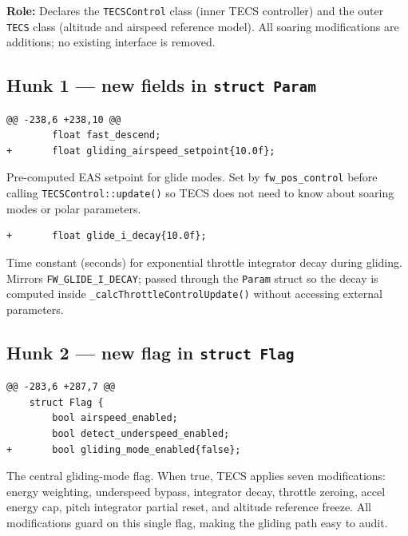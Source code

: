 \documentclass[12pt,a4paper]{article}
\begin{document}
\begin{annotation}
\textbf{Role:} Declares the \texttt{TECSControl} class (inner TECS controller) and the outer \texttt{TECS} class (altitude and airspeed reference model). All soaring modifications are additions; no existing interface is removed.
\end{annotation}

\subsection{Hunk 1 — new fields in \texttt{struct Param}}

\begin{lstlisting}[style=diff]
@@ -238,6 +238,10 @@
		float fast_descend;
+		float gliding_airspeed_setpoint{10.0f};
\end{lstlisting}
\begin{annotation}Pre-computed EAS setpoint for glide modes. Set by \texttt{fw\_pos\_control} before calling \texttt{TECSControl::update()} so TECS does not need to know about soaring modes or polar parameters.\end{annotation}

\begin{lstlisting}[style=diff]
+		float glide_i_decay{10.0f};
\end{lstlisting}
\begin{annotation}Time constant (seconds) for exponential throttle integrator decay during gliding. Mirrors \texttt{FW\_GLIDE\_I\_DECAY}; passed through the \texttt{Param} struct so the decay is computed inside \texttt{\_calcThrottleControlUpdate()} without accessing external parameters.\end{annotation}

\subsection{Hunk 2 — new flag in \texttt{struct Flag}}

\begin{lstlisting}[style=diff]
@@ -283,6 +287,7 @@
	struct Flag {
		bool airspeed_enabled;
		bool detect_underspeed_enabled;
+		bool gliding_mode_enabled{false};
\end{lstlisting}
\begin{annotation}The central gliding-mode flag. When true, TECS applies seven modifications: energy weighting, underspeed bypass, integrator decay, throttle zeroing, accel energy cap, pitch integrator partial reset, and altitude reference freeze. All modifications guard on this single flag, making the gliding path easy to audit.\end{annotation}
\end{document}
